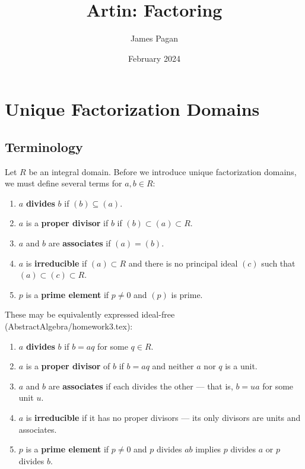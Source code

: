 \documentclass[11pt]{article}
\title{Artin: Factoring}
\author{James Pagan}
\date{February 2024}
\begin{document}
\maketitle
\tableofcontents
\newpage


\section{Unique Factorization Domains}


\subsection{Terminology}


Let $R$ be an integral domain. Before we introduce unique factorization domains, we must define several terms for $a, b \in R$:

\begin{enumerate}
  \item $a$ \textbf{divides} $b$ if $(b) \subseteq (a)$.
  \item $a$ is a \textbf{proper divisor} if $b$ if $(b) \subset (a) \subset R$.
  \item $a$ and $b$ are \textbf{associates} if $(a) = (b)$.
  \item $a$ is \textbf{irreducible} if $(a) \subset R$ and there is no principal ideal $(c)$ such that $(a) \subset (c) \subset R$.
  \item $p$ is a \textbf{prime element} if $p \ne 0$ and $(p)$ is prime.
\end{enumerate}

These may be equivalently expressed ideal-free (AbstractAlgebra/homework3.tex):
\begin{enumerate}
  \item $a$ \textbf{divides} $b$ if $b = aq$ for some $q \in R$.
  \item $a$ is a \textbf{proper divisor} of $b$ if $b = aq$ and neither $a$ nor $q$ is a unit.
  \item $a$ and $b$ are \textbf{associates} if each divides the other --- that is, $b = ua$ for some unit $u$.
  \item $a$ is \textbf{irreducible} if it has no proper divisors --- its only divisors are units and associates.
  \item $p$ is a \textbf{prime element} if $p \ne 0$ and $p$ divides $ab$ implies $p$ divides $a$ or $p$ divides $b$.
\end{enumerate}
\end{document}
